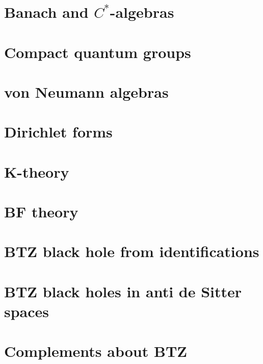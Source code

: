 \chapter{Banach and \texorpdfstring{$C^*$}{C*}-algebras}
   
   
   

\chapter{Compact quantum groups}


\chapter{von Neumann algebras}





\chapter{Dirichlet forms}


\chapter{K-theory}


\chapter{BF theory}


\chapter{BTZ black hole from identifications}




\chapter{BTZ black holes in anti de Sitter spaces}                  \label{ChapBHinAdS}
%
%









\chapter{Complements about BTZ}


